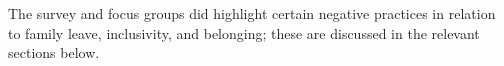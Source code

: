 The survey and focus groups did highlight certain negative practices in relation to family leave, inclusivity, and belonging; these are discussed in the relevant sections below. 













